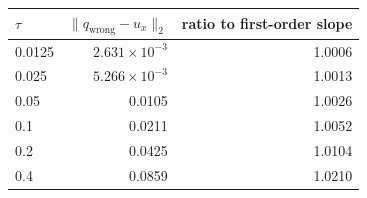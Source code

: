 \begin{tabular}{lrr}
\toprule
$\tau$ & $\|q_{\mathrm{wrong}} - u_x\|_2$ & ratio to first-order slope \\
\midrule
0.0125 & $2.631\times10^{-3}$ & 1.0006 \\
0.025 & $5.266\times10^{-3}$ & 1.0013 \\
0.05 & 0.0105 & 1.0026 \\
0.1 & 0.0211 & 1.0052 \\
0.2 & 0.0425 & 1.0104 \\
0.4 & 0.0859 & 1.0210 \\
\bottomrule
\end{tabular}
